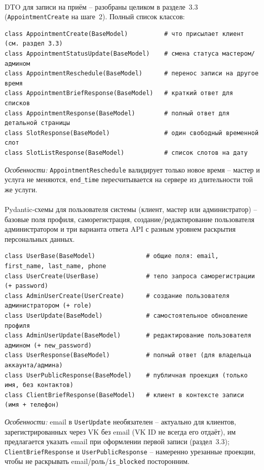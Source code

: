 \paragraph{}
DTO для записи на приём -- разобраны целиком в разделе~3.3
(\texttt{AppointmentCreate} на шаге~2). Полный список классов:
\begin{verbatim}
class AppointmentCreate(BaseModel)          # что присылает клиент (см. раздел 3.3)
class AppointmentStatusUpdate(BaseModel)    # смена статуса мастером/админом
class AppointmentReschedule(BaseModel)      # перенос записи на другое время
class AppointmentBriefResponse(BaseModel)   # краткий ответ для списков
class AppointmentResponse(BaseModel)        # полный ответ для детальной страницы
class SlotResponse(BaseModel)               # один свободный временной слот
class SlotListResponse(BaseModel)           # список слотов на дату
\end{verbatim}
\textit{Особенности:} \texttt{AppointmentReschedule} валидирует только
новое время -- мастер и услуга не меняются, \texttt{end_time}
пересчитывается на сервере из длительности той же услуги.

\paragraph{}
Pydantic-схемы для пользователя системы (клиент, мастер или
администратор) -- базовые поля профиля, саморегистрация,
создание/редактирование пользователя администратором и три варианта
ответа API с разным уровнем раскрытия персональных данных.
\begin{verbatim}
class UserBase(BaseModel)              # общие поля: email, first_name, last_name, phone
class UserCreate(UserBase)             # тело запроса саморегистрации (+ password)
class AdminUserCreate(UserCreate)      # создание пользователя администратором (+ role)
class UserUpdate(BaseModel)            # самостоятельное обновление профиля
class AdminUserUpdate(BaseModel)       # редактирование пользователя админом (+ new_password)
class UserResponse(BaseModel)          # полный ответ (для владельца аккаунта/админа)
class UserPublicResponse(BaseModel)    # публичная проекция (только имя, без контактов)
class ClientBriefResponse(BaseModel)   # клиент в контексте записи (имя + телефон)
\end{verbatim}
\textit{Особенности:} email в \texttt{UserUpdate} необязателен -- актуально
для клиентов, зарегистрированных через VK без email (VK ID не всегда его
отдаёт), им предлагается указать email при оформлении первой записи
(раздел~3.3); \texttt{ClientBriefResponse} и \texttt{UserPublicResponse} --
намеренно урезанные проекции, чтобы не раскрывать email/роль/\texttt{is_blocked}
посторонним.

